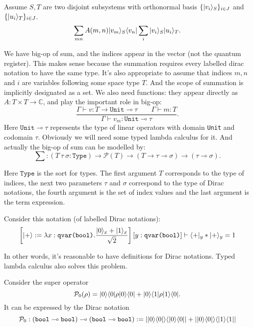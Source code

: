 \begin{example}
  Assume $S, T$ are two disjoint subsystems with orthonormal basis $\{|v_i\rangle_S\}_{i \in J}$ and $\{|u_i\rangle_T\}_{i \in J}$.
  $$
  \sum_{mn}A(m, n) |v_m\rangle_S\langle v_n| \sum_i |v_i\rangle_S |u_i\rangle_T.
  $$
\end{example}
We have big-op of sum, and the indices appear in the vector (not the quantum register). This makes sense because the summation requires every labelled dirac notation to have the same type. It's also appropriate to assume that indices $m, n$ and $i$ are variables following some space type $T$. And the scope of summation is implicitly designated as a set. We also need functions: they appear directly as $A : T \times T \to \mathbb{C}$, and play the important role in big-op:
$$
\frac{\Gamma \vdash v : T \to \texttt{Unit} \multimap \tau \qquad \Gamma \vdash m : T}{\Gamma \vdash v_m : \texttt{Unit} \multimap \tau}.
$$
Here $\texttt{Unit} \multimap \tau$ represents the type of linear operators with domain \texttt{Unit} and codomain $\tau$. Obviously we will need some typed lambda calculus for it. And actually the big-op of sum can be modelled by:
$$
\sum : (T\ \tau\ \sigma : \texttt{Type}) \to \mathcal{P}(T) \to (T \to \tau \multimap \sigma) \to (\tau \multimap \sigma).
$$

Here $\texttt{Type}$ is the sort for types. The first argument $T$ corresponds to the type of indices, the next two parameters $\tau$ and $\sigma$ correspond to the type of Dirac notations, the fourth argument is the set of index values and the last argument is the term expression.

\begin{example}[definitions]
  Consider this notation (of labelled Dirac notations):
  $$
  \left [|+\rangle := \lambda x:\texttt{qvar(bool)}.\frac{|0\rangle_x + |1\rangle_x}{\sqrt{2}} \right ][y : \texttt{qvar(bool)}] \vdash \langle +|_y * |+\rangle_y = 1
  $$
\end{example}
In other words, it's reasonable to have definitions for Dirac notations. Typed lambda calculus also solves this problem.

\begin{example}
  Consider the super operator 
  $$
  \mathcal{P}_0 (\rho) = |0\rangle\langle 0| \rho |0\rangle\langle 0| + |0\rangle\langle 1| \rho |1\rangle\langle 0|.
  $$
  It can be expressed by the Dirac notation
  $$
  \mathcal{P}_0 : (\texttt{bool} \multimap \texttt{bool}) \multimap (\texttt{bool} \multimap \texttt{bool}) := ||0\rangle\langle 0|\rangle\langle |0\rangle\langle 0|| + ||0\rangle\langle 0|\rangle\langle |1\rangle\langle 1||
  $$
\end{example}

